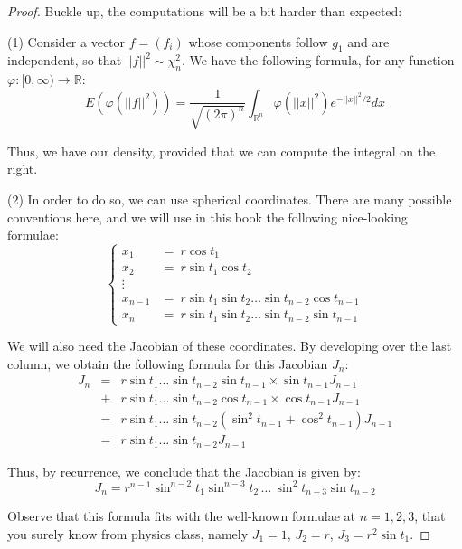 \documentclass[12pt]{amsbook}
\begin{document}
\begin{proof}
Buckle up, the computations will be a bit harder than expected:

\medskip

(1) Consider a vector $f=(f_i)$ whose components follow $g_1$ and are independent, so that $||f||^2\sim\chi_n^2$. We have the following formula, for any function $\varphi:[0,\infty)\to\mathbb R$:
$$E\left(\varphi(||f||^2)\right)
=\frac{1}{\sqrt{(2\pi)^n}}\int_{\mathbb R^n}\varphi(||x||^2)e^{-||x||^2/2}dx$$

Thus, we have our density, provided that we can compute the integral on the right.

\medskip

(2) In order to do so, we can use spherical coordinates. There are many possible conventions here, and we will use in this book the following nice-looking formulae:
$$\begin{cases}
x_1\!\!\!&=\ r\cos t_1\\
x_2\!\!\!&=\ r\sin t_1\cos t_2\\
\vdots\\
x_{n-1}\!\!\!&=\ r\sin t_1\sin t_2\ldots\sin t_{n-2}\cos t_{n-1}\\
x_n\!\!\!&=\ r\sin t_1\sin t_2\ldots\sin t_{n-2}\sin t_{n-1}
\end{cases}$$

We will also need the Jacobian of these coordinates. By developing over the last column, we obtain the following formula for this Jacobian $J_n$:
\begin{eqnarray*}
J_n
&=&r\sin t_1\ldots\sin t_{n-2}\sin t_{n-1}\times \sin t_{n-1}J_{n-1}\\
&+&r\sin t_1\ldots \sin t_{n-2}\cos t_{n-1}\times\cos t_{n-1}J_{n-1}\\
&=&r\sin t_1\ldots\sin t_{n-2}(\sin^2 t_{n-1}+\cos^2 t_{n-1})J_{n-1}\\
&=&r\sin t_1\ldots\sin t_{n-2}J_{n-1}
\end{eqnarray*}

Thus, by recurrence, we conclude that the Jacobian is given by:
$$J_n=r^{n-1}\sin^{n-2}t_1\sin^{n-3}t_2\,\ldots\,\sin^2t_{n-3}\sin t_{n-2}$$

Observe that this formula fits with the well-known formulae at $n=1,2,3$, that you surely know from physics class, namely $J_1=1$, $J_2=r$, $J_3=r^2\sin t_1$.

\medskip


\end{proof}
\end{document}
